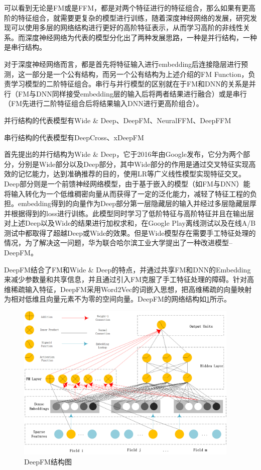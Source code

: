 可以看到无论是FM或是FFM，都是对两个特征进行的特征组合，那么如果有更高阶的特征组合，就需要更复杂的模型进行训练，随着深度神经网络的发展，研究发现可以使用多层的网络结构进行更好的高阶特征表示，从而学习高阶的非线性关系。而深度神经网络为代表的模型分化出了两种发展思路，一种是并行结构，一种是串行结构。





对于深度神经网络而言，都是首先将特征输入进行embedding后连接隐层进行预测，这一部分是一个公有结构，而另一个公有结构为上述介绍的FM Function，负责学习模型的二阶特征组合。串行与并行模型的区别就在于FM和DNN的关系是并行（FM与DNN同样接受embedding层的输入后将两者结果进行融合）或是串行（FM先进行二阶特征组合后将结果输入DNN进行更高阶组合）。

并行结构的代表模型有Wide \& Deep、DeepFM、NeuralFFM、DeepFFM

串行结构的代表模型有DeepCross、xDeepFM

首先提出的并行结构为Wide \& Deep，它于2016年由Google发布，它分为两个部分，分别是Wide部分以及Deep部分，其中Wide部分的作用是通过交叉特征实现高效的记忆能力，达到准确推荐的目的，使用LR等广义线性模型实现特征交叉。Deep部分则是一个前馈神经网络模型，由于基于嵌入的模型（如FM与DNN）能将输入转化为一个低维稠密向量从而获得了一定的泛化能力，减轻了特征工程的负担。embedding得到的向量作为Deep部分第一层隐藏层的输入并经过多层隐藏层厚并根据得到的loss进行训练。此模型同时学习了低阶特征与高阶特征并且在输出层对上述Deep以及Wide的结果进行加权求和，在Google Play离线测试以及在线A/B测试中都取得了超越Deep或Wide的效果。但是Wide模型存在需要手工特征处理的情况，为了解决这一问题，华为联合哈尔滨工业大学提出了一种改进模型--DeepFM。

DeepFM结合了FM和Wide \& Deep的特点，并通过共享FM和DNN的Embedding来减少参数量和共享信息，并且通过引入FM克服了手工特征处理的障碍。针对高维稀疏输入特征，DeepFM采用Word2Vec的词嵌入思想，把高维稀疏的向量映射为相对低维且向量元素不为零的空间向量。DeepFM的网络结构如\ref{DeepFM结构图}所示。
\begin{figure}[htb]
  \vspace{13pt} %
  \centering
  \includegraphics[width=0.95\textwidth]{images/DeepFM.png}
  \caption{DeepFM结构图\cite{DeepFM结构图}}\label{DeepFM结构图} %
\end{figure}


